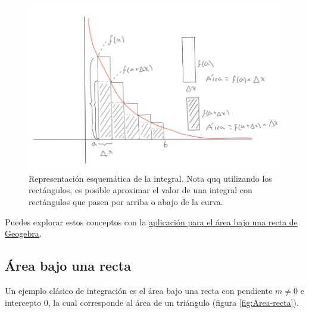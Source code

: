 \documentclass[
]{book}
\begin{document}
\begin{figure}

{\centering \includegraphics{Unidad-III/Esquema-integral} 

}

\caption{Representación esquemática de la integral. Nota quq utilizando los rectángulos, es posible aproximar el valor de una integral con rectángulos que pasen por arriba o abajo de la curva.}\label{fig:La-integral}
\end{figure}

Puedes explorar estos conceptos con la \href{https://www.geogebra.org/classic/wmpqmr4a}{aplicación para el área bajo una recta de Geogebra}.

\hypertarget{uxe1rea-bajo-una-recta}{%
\subsection{Área bajo una recta}\label{uxe1rea-bajo-una-recta}}

Un ejemplo clásico de integración es el área bajo una recta con pendiente \(m \neq 0\) e intercepto \(0\), la cual corresponde al área de un triángulo (figura \ref{fig:Area-recta}).
\end{document}
